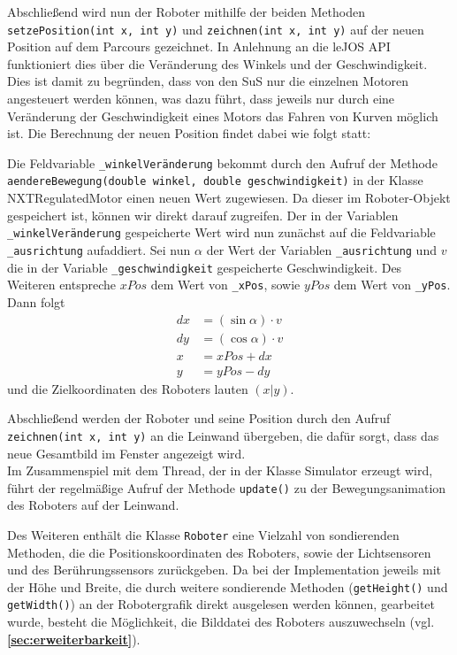 \documentclass[paper=a4, DIV=calc, BCOR=15mm, twoside=on, onecolumn=on, open = right, titlepage =on, parskip =half, headsepline = on, footsepline = on, chapterprefix = off, appendixprefix = off, fontsize = 12pt, numbers = noenddot, abstract = on]{scrbook}
\begin{document}
Abschließend wird nun der Roboter mithilfe der beiden Methoden \texttt{se\-tzePo\-si\-tion(int x, int y)} und \texttt{zeichnen(int x, int y)} auf der neuen Position auf dem Parcours gezeichnet. In Anlehnung an die leJOS API funktioniert dies über die Veränderung des Winkels und der Geschwindigkeit. Dies ist damit zu begründen, dass von den SuS nur die einzelnen Motoren angesteuert werden können, was dazu führt, dass jeweils nur durch eine Veränderung der Geschwindigkeit eines Motors das Fahren von Kurven möglich ist. Die Berechnung der neuen Position findet dabei wie folgt statt:

Die Feldvariable \texttt{{\_}win\-kel\-Ver\-än\-derung} bekommt durch den Aufruf der Methode \texttt{aen\-de\-re\-Be\-we\-gung(double win\-kel, double ge\-schwin\-dig\-keit)} in der Klasse NXTRegulatedMotor einen neuen Wert zugewiesen. Da dieser im Roboter-Objekt gespeichert ist, können wir direkt darauf zugreifen. Der in der Variablen \texttt{{\_}win\-kel\-Ver\-än\-derung} gespeicherte Wert wird nun zunächst auf die Feldvariable \texttt{{\_}ausrichtung} aufaddiert. Sei nun $\alpha$ der Wert der Variablen \texttt{{\_}ausrichtung} und $v$ die in der Variable \texttt{{\_}ge\-schwin\-dig\-keit} gespeicherte Geschwindigkeit. Des Weiteren entspreche $xPos$ dem Wert von \texttt{{\_}xPos}, sowie $yPos$ dem Wert von \texttt{{\_}yPos}. Dann folgt
\begin{align*}
dx & = \left( \sin \alpha \right) \cdot v\\
dy & = \left( \cos \alpha \right) \cdot v\\
x & = xPos + dx\\
y & = yPos - dy
\end{align*}
und die Zielkoordinaten des Roboters lauten $\left( x \vert y \right)$.

Abschließend werden der Roboter und seine Position durch den Aufruf \texttt{zeich\-nen(int x, int y)} an die Leinwand übergeben, die dafür sorgt, dass das neue Gesamtbild im Fenster angezeigt wird.\\
Im Zusammenspiel mit dem Thread, der in der Klasse Simulator erzeugt wird, führt der regelmäßige Aufruf der Methode \texttt{update()} zu der Bewegungsanimation des Roboters auf der Leinwand.


Des Weiteren enthält die Klasse \texttt{Roboter} eine Vielzahl von sondierenden Methoden, die die Positionskoordinaten des Roboters, sowie der Lichtsensoren und des Berührungssensors zurückgeben. Da bei der Implementation jeweils mit der Höhe und Breite, die durch weitere sondierende Methoden (\texttt{getHeight()} und \texttt{getWidth()}) an der Robotergrafik direkt ausgelesen werden können, gearbeitet wurde, besteht die Möglichkeit, die Bilddatei des Roboters auszuwechseln (vgl. \textbf{\ref{sec:erweiterbarkeit}}).
\end{document}
